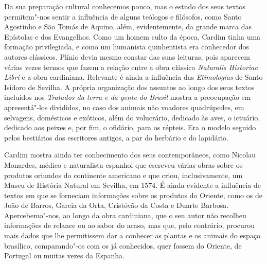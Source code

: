  Da sua preparação cultural conhecemos pouco, mas o estudo dos seus
textos permitem"-nos sentir a influência de alguns teólogos e filósofos,
como Santo Agostinho e São Tomás de Aquino, além, evidentemente, da
grande marca das Epístolas e dos Evangelhos. Como um homem culto da
época, Cardim tinha uma formação privilegiada, e como um humanista
quinhentista era conhecedor dos autores clássicos. Plínio devia mesmo
constar das suas leituras, pois aparecem várias vezes termos que fazem
a relação entre a obra clássica \textit{Naturalis Historiae Libri} e
a obra cardiniana. Relevante é ainda a influência das
\textit{Etimologias} de Santo Isidoro de Sevilha. A própria organização
dos assuntos ao longo dos seus textos incluídos nos \textit{Tratados da
terra e da gente do Brasil} mostra a preocupação em apresentá"-los
divididos, no caso dos animais não voadores quadrúpedes, em selvagens,
domésticos e exóticos, além do volucrário, dedicado às aves, o
ictuário, dedicado aos peixes e, por fim, o ofidário, para os répteis.
Era o modelo seguido pelos bestiários dos escritores antigos, a par do
herbário e do lapidário. 

 Cardim mostra ainda ter conhecimento dos seus
contemporâneos, como Nicolau Monardes, médico e naturalista espanhol
que escreveu várias obras sobre os produtos oriundos do continente
americano e que criou, inclusivamente, um Museu de História Natural em
Sevilha, em 1574. É ainda evidente a influência de textos em que se
forneciam informações sobre os produtos do Oriente, como os de João de
Barros, Garcia da Orta, Cristóvão da Costa e Duarte Barbosa.
Apercebemo"-nos, ao longo da obra cardiniana, que o seu autor não
recolheu informações de relance ou ao sabor do acaso, mas que, pelo
contrário, procurou mais dados que lhe permitissem dar a conhecer as
plantas e os animais do espaço brasílico, comparando"-os com os já
conhecidos, quer fossem do Oriente, de Portugal ou muitas vezes da Espanha. 

